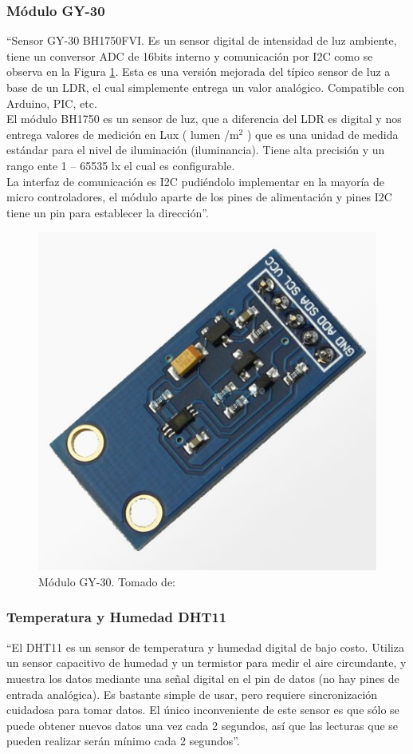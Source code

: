 \subsubsection{Módulo GY-30}

``Sensor GY-30 BH1750FVI. Es un sensor digital de intensidad de luz ambiente, tiene un conversor ADC de 16bits interno y comunicación por I2C como se observa en la Figura \ref{fig:gy-30}. Esta es una versión mejorada del típico sensor de luz a base de un LDR, el cual simplemente entrega un valor analógico. Compatible con Arduino, PIC, etc. \\

El módulo BH1750 es un sensor de luz, que a diferencia del LDR es digital y nos entrega valores de medición en Lux ( lumen /m$^2$ ) que es una  unidad de medida estándar para el nivel de iluminación (iluminancia). Tiene alta precisión y un rango ente 1 – 65535 lx el cual es configurable.\\

La interfaz de comunicación es I2C pudiéndolo implementar en la mayoría de micro controladores, el módulo aparte de los pines de alimentación y pines I2C tiene un pin para establecer la dirección''.\cite{GY30}

\begin{figure}[H]
	\centering
	\caption{Módulo GY-30. Tomado de: \cite{GY30}}
	\label{fig:gy-30}
	\includegraphics[width=0.4\linewidth]{Imagenes/gy-30}
\end{figure}

\subsubsection{Temperatura y Humedad DHT11}

``El DHT11 es un sensor de temperatura y humedad digital de bajo costo. Utiliza un sensor capacitivo de humedad y un termistor para medir el aire circundante, y muestra los datos mediante una señal digital en el pin de datos (no hay pines de entrada analógica). Es bastante simple de usar, pero requiere sincronización cuidadosa para tomar datos. El único inconveniente de este sensor es que sólo se puede obtener nuevos datos una vez cada 2 segundos, así que las lecturas que se pueden realizar serán mínimo cada 2 segundos''. \cite{DHT11}

